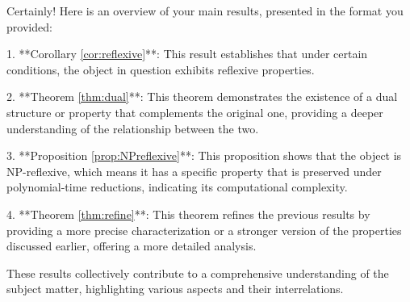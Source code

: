 Certainly! Here is an overview of your main results, presented in the format you provided:

1. **Corollary \cref{cor:reflexive}**: This result establishes that under certain conditions, the object in question exhibits reflexive properties.

2. **Theorem \cref{thm:dual}**: This theorem demonstrates the existence of a dual structure or property that complements the original one, providing a deeper understanding of the relationship between the two.

3. **Proposition \cref{prop:NPreflexive}**: This proposition shows that the object is NP-reflexive, which means it has a specific property that is preserved under polynomial-time reductions, indicating its computational complexity.

4. **Theorem \cref{thm:refine}**: This theorem refines the previous results by providing a more precise characterization or a stronger version of the properties discussed earlier, offering a more detailed analysis.

These results collectively contribute to a comprehensive understanding of the subject matter, highlighting various aspects and their interrelations.